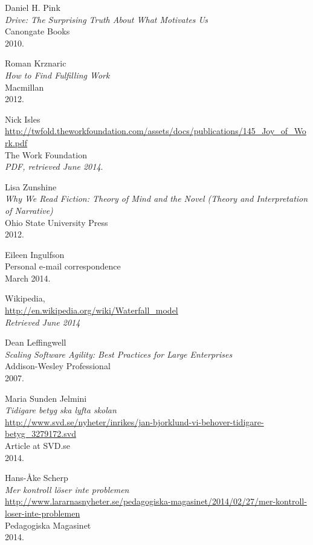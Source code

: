 \begin{thebibliography}{99}
  Daniel H. Pink \\
  \emph{Drive: The Surprising Truth About What Motivates Us} \\
  Canongate Books \\
  2010.

  Roman Krznaric \\
  \emph{How to Find Fulfilling Work} \\
  Macmillan \\
  2012.

  Nick Isles \\
  \url{http://twfold.theworkfoundation.com/assets/docs/publications/145_Joy_of_Work.pdf} \\
  The Work Foundation \\
  \emph{PDF, retrieved June 2014}.

  Lisa Zunshine \\
  \emph{Why We Read Fiction: Theory of Mind and the Novel (Theory and Interpretation of Narrative)} \\
  Ohio State University Press \\
  2012.

  Eileen Ingulfson \\
  Personal e-mail correspondence \\
  March 2014.

  Wikipedia, \\
  \url{http://en.wikipedia.org/wiki/Waterfall_model} \\
  \emph{Retrieved June 2014}

  Dean Leffingwell \\
  \emph{Scaling Software Agility: Best
Practices for Large Enterprises} \\
  Addison-Wesley Professional \\
  2007.

  Maria Sunden Jelmini \\
  \emph{Tidigare betyg ska lyfta skolan} \\
  \url{http://www.svd.se/nyheter/inrikes/jan-bjorklund-vi-behover-tidigare-betyg_3279172.svd} \\
  Article at SVD.se \\
  2014.

  Hans-Åke Scherp \\
  \emph{
Mer kontroll löser inte problemen} \\
  \url{http://www.lararnasnyheter.se/pedagogiska-magasinet/2014/02/27/mer-kontroll-loser-inte-problemen} \\
  Pedagogiska Magasinet \\
  2014.


\end{thebibliography}
